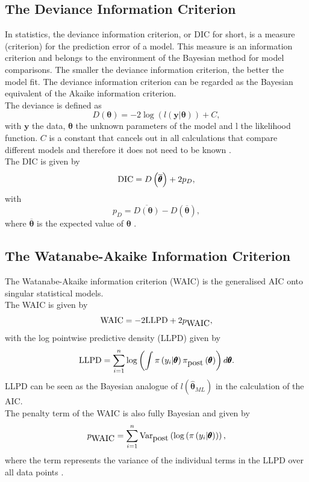 \subsection{The Deviance Information Criterion}
In statistics, the deviance information criterion, or DIC for short, is a measure (criterion) for the prediction error of a model.
This measure is an information criterion and belongs to the environment of the Bayesian method for model comparisons. The smaller the deviance information criterion, the better the model fit. The deviance information criterion can be regarded as the Bayesian equivalent of the Akaike information criterion. \\
The deviance is defined as 
\begin{equation}
    D\left(\pmb{\theta}\right)=-2\log\left(l\left(\pmb{y}|\pmb{\theta}\right)\right)+C,
\end{equation}
with $\pmb{y}$ the data, $\pmb{\theta}$ the unknown parameters of the model and l the likelihood function. $C$ is a constant that cancels out in all calculations that compare different models and therefore it does not need to be known \autocite[][]{nelder1972generalized}. \\
The DIC is given by
\begin{equation}
    \hbox{DIC}=D\left(\overline{\pmb{\theta}}\right)+2p_D,
\end{equation}
with
\begin{equation}
    p_D=\overline{D\left(\pmb{\theta}\right)}-D\left(\overline{\pmb{\theta}}\right),
\end{equation}
where $\overline{\pmb{\theta}}$ is the expected value of $\pmb{\theta}$ \autocite[][]{spiegelhalter2014deviance}.
\subsection{The Watanabe-Akaike Information Criterion}
The Watanabe-Akaike information criterion (WAIC) is the generalised AIC onto singular statistical models. \\
The WAIC is given by
\begin{equation}
    \hbox{WAIC} = -2\hbox{LLPD}+2p_{\hbox{WAIC}},
\end{equation}
with the log pointwise predictive density (LLPD) given by
\begin{equation}
    \hbox{LLPD} = \sum_{i=1}^n\log\left(\int \pi\left(y_i|\pmb{\theta}\right)\pi_{\hbox{post}}\left(\pmb{\theta}\right)\right)d\pmb{\theta}.
\end{equation}
LLPD can be seen as the Bayesian analogue of $l\left(\widehat{\pmb{\theta}}_{ML}\right)$ in the calculation of the AIC.\\
The penalty term of the WAIC is also fully Bayesian and given by
\begin{equation}
    p_{\hbox{WAIC}}=\sum_{i=1}^n\hbox{Var}_{\hbox{post}}\left(\log\left(\pi\left(y_i|\pmb{\theta}\right)\right)\right),
\end{equation}
where the term represents the variance of the individual terms in the LLPD over all data points \autocite[][]{watanabe2010asymptotic, yong2018loo}.
